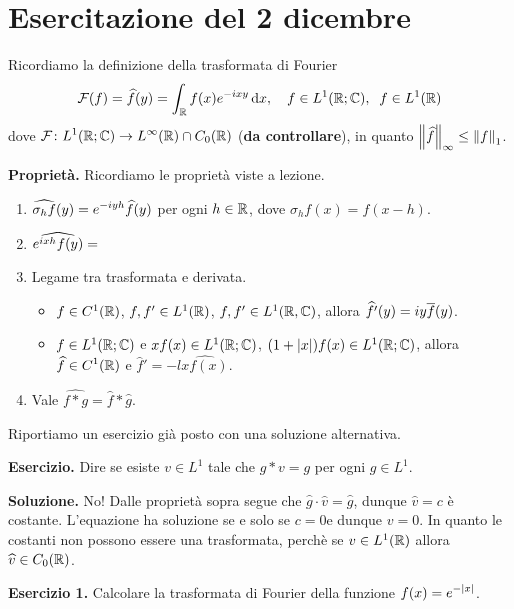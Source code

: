 \section{Esercitazione del 2 dicembre}

Ricordiamo la definizione della trasformata di Fourier
%
$$
	\mathcal{F}(f) = \widehat{f}(y) = \int_{\mathbb R} f(x) e^{-ixy} \,\mathrm{d} x, \quad f \in L^1(\mathbb R;\mathbb C), \;\; f \in L^1(\mathbb R)
$$
%
dove $\displaystyle \mathcal{F} \colon L^1(\mathbb R;\mathbb C) \to L^\infty(\mathbb R) \cap C_0(\mathbb R)$ (\textbf{da controllare}), in quanto $\left\lVert \widehat{f} \right\rVert_\infty \leq \left\lVert f \right\rVert_1$.


\textbf{Proprietà.} Ricordiamo le proprietà viste a lezione.
\begin{enumerate}
	\item $\displaystyle \widehat{\sigma_h f}(y) = e^{-iyh} \widehat{f}(y)$ per ogni $h \in \mathbb R$, dove $\sigma_h f(x) = f(x - h)$.


	\item $\displaystyle \widehat{e^{ixh} f(y)} = $


	\item Legame tra trasformata e derivata.
	\begin{itemize}

		\item $f \in C^1(\mathbb R)$, $f,f' \in L^1(\mathbb R)$, $f,f' \in L^1(\mathbb R,\mathbb C)$, allora $\displaystyle \widehat{f'}(y) = iy \overline{f}(y)$.


		\item $f \in L^1(\mathbb R;\mathbb C)$ e $xf(x) \in L^1(\mathbb R;\mathbb C)$, $(1 + |x|) f(x) \in L^1(\mathbb R;\mathbb C)$, allora $\displaystyle \widehat{f} \in C^1(\mathbb R)$ e $\hat{f}' = -l \hat{xf(x)}$.

	\end{itemize}


	\item  Vale $\hat{f \ast g} = \hat{f} \ast \hat{g}$.
	
\end{enumerate}

Riportiamo un esercizio già posto con una soluzione alternativa. 

\textbf{Esercizio.} Dire se esiste $v \in L^1$ tale che $g \ast v = g$ per ogni $g \in L^1$.

\textbf{Soluzione.} No! Dalle proprietà sopra segue che $\hat{g} \cdot \hat{v} = \hat{g}$, dunque $\hat{v} = c$ è costante. L'equazione ha soluzione se e solo se $c = 0$e dunque $v = 0$. In quanto le costanti non possono essere una trasformata, perchè se $v \in L^1(\mathbb R)$ allora $\widehat{v} \in C_0(\mathbb R)$.

\vss

\textbf{Esercizio 1.} Calcolare la trasformata di Fourier della funzione $\displaystyle f(x) = e^{-|x|}$.

